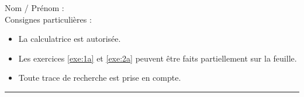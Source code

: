 

\usetikzlibrary {datavisualization}

\newcommand{\tableaucroise}[4]{
\begin{tabular}{|c|c|c|c|}
	\cline{2-4}
	\multicolumn{1}{c|}{} & #1 \\ \hline
	#2 \\ \hline
	#3  \\ \hline
	#4  \\ \hline
\end{tabular}
}



\reversemarginpar

\pagestyle{fancy}
\fancyhead[R]{\today}

\null\vspace{-30pt}
Nom / Prénom : \\

Consignes particulières : 
\begin{itemize}[label=$\bullet$]
	\item 
	La calculatrice est {autorisée}.
	\item 
	Les exercices \ref{exe:1a} et \ref{exe:2a} peuvent être faits partiellement sur la feuille.
	\item 
	Toute trace de recherche est prise en compte.
\end{itemize}

\hrule

